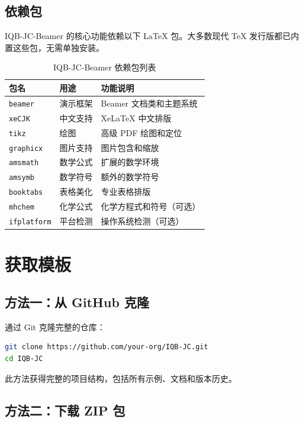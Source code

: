 \subsection{依赖包}

IQB-JC-Beamer 的核心功能依赖以下 LaTeX 包。大多数现代 TeX 发行版都已内置这些包，无需单独安装。

\begin{table}[h]
\centering
\caption{IQB-JC-Beamer 依赖包列表}
\label{tab:dependencies}
\begin{tabular}{p{2.5cm}p{4cm}p{6.5cm}}
\toprule
\textbf{包名} & \textbf{用途} & \textbf{功能说明} \\
\midrule
\lstinline|beamer| & 演示框架 & Beamer 文档类和主题系统 \\
\lstinline|xeCJK| & 中文支持 & XeLaTeX 中文排版 \\
\lstinline|tikz| & 绘图 & 高级 PDF 绘图和定位 \\
\lstinline|graphicx| & 图片支持 & 图片包含和缩放 \\
\lstinline|amsmath| & 数学公式 & 扩展的数学环境 \\
\lstinline|amsymb| & 数学符号 & 额外的数学符号 \\
\lstinline|booktabs| & 表格美化 & 专业表格排版 \\
\lstinline|mhchem| & 化学公式 & 化学方程式和符号（可选） \\
\lstinline|ifplatform| & 平台检测 & 操作系统检测（可选） \\
\bottomrule
\end{tabular}
\end{table}

\section{获取模板}

\subsection{方法一：从 GitHub 克隆}

通过 Git 克隆完整的仓库：

\begin{lstlisting}[style=blockstyle,language=bash]
git clone https://github.com/your-org/IQB-JC.git
cd IQB-JC
\end{lstlisting}

此方法获得完整的项目结构，包括所有示例、文档和版本历史。

\subsection{方法二：下载 ZIP 包}

